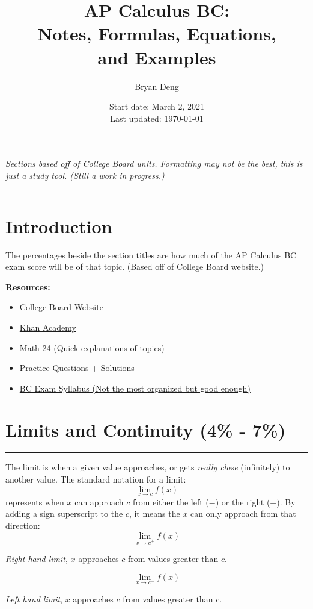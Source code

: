 \documentclass[12pt]{article}
\title{\textbf{AP Calculus BC:\\Notes, Formulas,  Equations,\\and Examples}}
\author{Bryan Deng}
\date{Start date: March 2, 2021\\Last updated: \today}
\newcommand{\fline}{\par\noindent\rule{\textwidth}{0.1pt}} %
\begin{document}
    \maketitle
    \vfill
    \begin{center}
        \textit{Sections based off of College Board units.
        \newline
        Formatting may not be the best, this is just a study tool. (Still a work in progress.)}
    \end{center}
    \newpage

    \tableofcontents
    \fline
    \newpage

    \section*{Introduction}
        \indent The percentages beside the section titles are how much of the AP Calculus BC exam score will be of that topic. (Based off of College Board website.)

        \noindent \textbf{Resources:}
        \begin{itemize}
            \item \href{https://apstudents.collegeboard.org/courses/ap-calculus-bc}{College Board Website}
            \item \href{https://www.khanacademy.org/math/ap-calculus-bc}{Khan Academy}
            \item \href{https://www.math24.net/topics-calculus}{Math 24 (Quick explanations of topics)}
            \item \href{https://www.math.ucdavis.edu/~kouba/CalcOneDIRECTORY/}{Practice Questions + Solutions}
            \item \href{https://www.chelmsford.k12.ma.us/site/handlers/filedownload.ashx?moduleinstanceid=2496&dataid=7289&FileName=AP%20Calculus%20BC%20Syllabus.pdf}{BC Exam Syllabus (Not the most organized but good enough)}
        \end{itemize}

    \section{Limits and Continuity (4\% - 7\%)}
    \fline

        The limit is when a given value approaches, or gets \textit{really close} (infinitely) to another value. The standard notation for a limit:
        \[ \lim_{x \to c} f(x) \]
        represents when $x$ can approach $c$ from either the left ($-$) or the right ($+$). By adding a sign superscript to the $c$, it means the $x$ can only approach from that direction:
        \[ \lim_{x \to c^+} f(x) \]
        \begin{center}
            \textit{Right hand limit}, $x$ approaches $c$ from values greater than $c$.
        \end{center}
        \[ \lim_{x \to c^-} f(x) \]
        \begin{center}
            \textit{Left hand limit}, $x$ approaches $c$ from values greater than $c$.
        \end{center}
\end{document}
